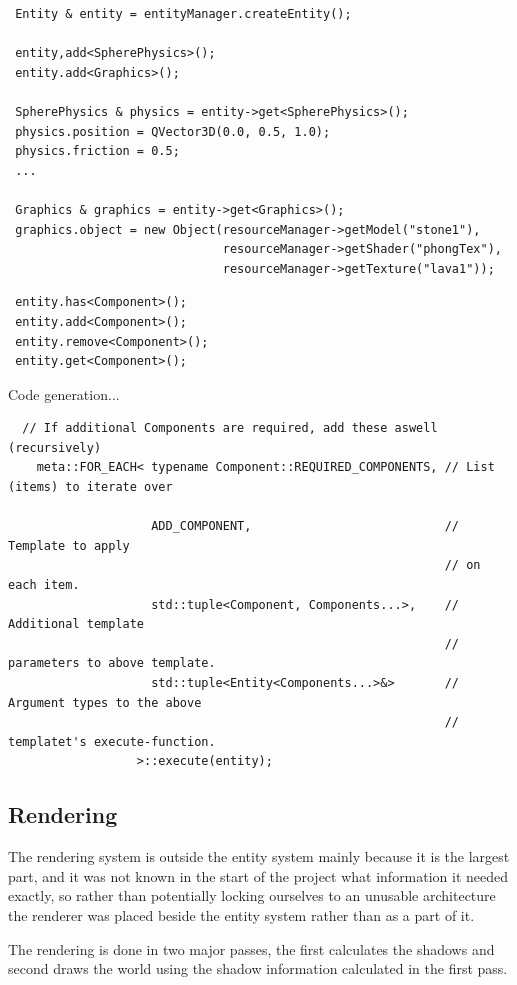 \begin{lstlisting}
 Entity & entity = entityManager.createEntity();
 
 entity,add<SpherePhysics>();
 entity.add<Graphics>();
 
 SpherePhysics & physics = entity->get<SpherePhysics>();
 physics.position = QVector3D(0.0, 0.5, 1.0);
 physics.friction = 0.5;
 ...
 
 Graphics & graphics = entity->get<Graphics>();
 graphics.object = new Object(resourceManager->getModel("stone1"),
                              resourceManager->getShader("phongTex"),
                              resourceManager->getTexture("lava1")); 
\end{lstlisting}

\begin{lstlisting}
 entity.has<Component>();
 entity.add<Component>();
 entity.remove<Component>();
 entity.get<Component>();
\end{lstlisting}

Code generation...
\begin{lstlisting}
  // If additional Components are required, add these aswell (recursively)
    meta::FOR_EACH< typename Component::REQUIRED_COMPONENTS, // List (items) to iterate over
    
                    ADD_COMPONENT,                           // Template to apply
                                                             // on each item.
                    std::tuple<Component, Components...>,    // Additional template
                                                             // parameters to above template.
                    std::tuple<Entity<Components...>&>       // Argument types to the above
                                                             // templatet's execute-function.
                  >::execute(entity);

\end{lstlisting}

\subsection{Rendering}
The rendering system is outside the entity system mainly because it is the largest part, and it was not known in the start of the project what information it needed exactly, so rather than potentially locking ourselves to an unusable architecture the renderer was placed beside the entity system rather than as a part of it.

The rendering is done in two major passes, the first calculates the shadows and second draws the world using the shadow information calculated in the first pass.

